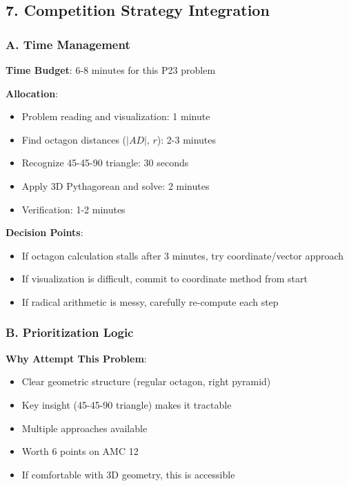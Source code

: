 \documentclass[12pt]{article}
\begin{document}
\begin{competitionbox}
\subsection*{7. Competition Strategy Integration}

\subsubsection*{A. Time Management}

\textbf{Time Budget}: 6-8 minutes for this P23 problem

\textbf{Allocation}:
\begin{itemize}
    \item Problem reading and visualization: 1 minute
    \item Find octagon distances ($|AD|$, $r$): 2-3 minutes
    \item Recognize 45-45-90 triangle: 30 seconds
    \item Apply 3D Pythagorean and solve: 2 minutes
    \item Verification: 1-2 minutes
\end{itemize}

\textbf{Decision Points}:
\begin{itemize}
    \item If octagon calculation stalls after 3 minutes, try coordinate/vector approach
    \item If visualization is difficult, commit to coordinate method from start
    \item If radical arithmetic is messy, carefully re-compute each step
\end{itemize}

\subsubsection*{B. Prioritization Logic}

\textbf{Why Attempt This Problem}:
\begin{itemize}
    \item Clear geometric structure (regular octagon, right pyramid)
    \item Key insight (45-45-90 triangle) makes it tractable
    \item Multiple approaches available
    \item Worth 6 points on AMC 12
    \item If comfortable with 3D geometry, this is accessible
\end{itemize}


\end{competitionbox}
\end{document}
